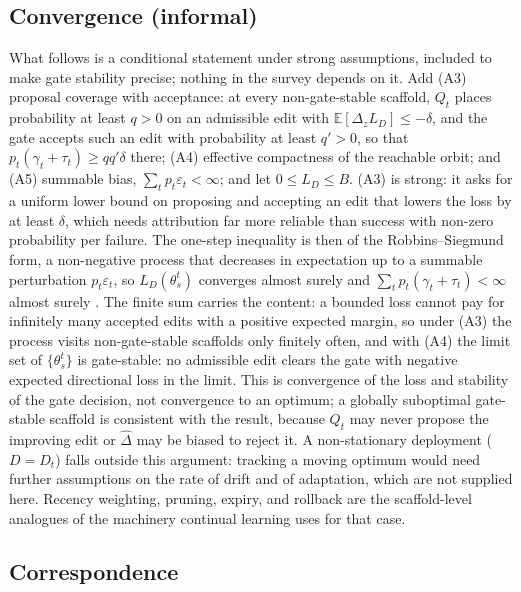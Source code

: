 \subsection{Convergence (informal)}\label{convergence-informal}

What follows is a conditional statement under strong assumptions, included to make gate stability precise; nothing in the survey depends on it. Add (A3) proposal coverage with acceptance: at every non-gate-stable scaffold, \(Q_t\) places probability at least \(q > 0\) on an admissible edit with \(\mathbb{E}[\Delta_z L_D] \le -\delta\), and the gate accepts such an edit with probability at least \(q' > 0\), so that \(p_t(\gamma_t + \tau_t) \ge q q' \delta\) there; (A4) effective compactness of the reachable orbit; and (A5) summable bias, \(\sum_t p_t \varepsilon_t < \infty\); and let \(0 \le L_D \le B\). (A3) is strong: it asks for a uniform lower bound on proposing and accepting an edit that lowers the loss by at least \(\delta\), which needs attribution far more reliable than success with non-zero probability per failure. The one-step inequality is then of the Robbins--Siegmund form, a non-negative process that decreases in expectation up to a summable perturbation \(p_t \varepsilon_t\), so \(L_D(\theta_s^t)\) converges almost surely and \(\sum_t p_t(\gamma_t + \tau_t) < \infty\) almost surely \citep{robbins1971convergence}. The finite sum carries the content: a bounded loss cannot pay for infinitely many accepted edits with a positive expected margin, so under (A3) the process visits non-gate-stable scaffolds only finitely often, and with (A4) the limit set of \(\{\theta_s^t\}\) is gate-stable: no admissible edit clears the gate with negative expected directional loss in the limit. This is convergence of the loss and stability of the gate decision, not convergence to an optimum; a globally suboptimal gate-stable scaffold is consistent with the result, because \(Q_t\) may never propose the improving edit or \(\widehat{\Delta}\) may be biased to reject it. A non-stationary deployment (\(D = D_t\)) falls outside this argument: tracking a moving optimum would need further assumptions on the rate of drift and of adaptation, which are not supplied here. Recency weighting, pruning, expiry, and rollback are the scaffold-level analogues of the machinery continual learning uses for that case.

\subsection{Correspondence}\label{correspondence}

